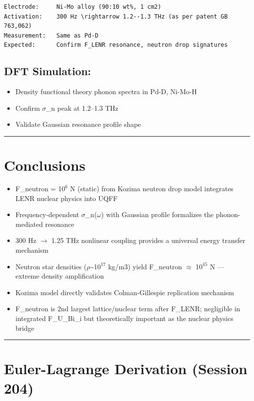 \documentclass[12pt,a4paper]{article}
\begin{document}
\begin{verbatim}
Electrode:     Ni-Mo alloy (90:10 wt%, 1 cm2)
Activation:    300 Hz \rightarrow 1.2--1.3 THz (as per patent GB 763,062)
Measurement:   Same as Pd-D
Expected:      Confirm F_LENR resonance, neutron drop signatures
\end{verbatim}

\subsection{DFT Simulation:}

\begin{itemize}
  \item Density functional theory phonon spectra in Pd-D, Ni-Mo-H
  \item Confirm $\sigma$\_n peak at 1.2--1.3 THz
  \item Validate Gaussian resonance profile shape
\end{itemize}

\medskip\hrule\medskip

\section{Conclusions}

\begin{itemize}
  \item F\_neutron = 1$0^{6}$ N (static) from Kozima neutron drop model integrates LENR nuclear physics into UQFF
  \item Frequency-dependent $\sigma$\_n($\omega$) with Gaussian profile formalizes the phonon-mediated resonance
  \item 300 Hz $\to$ 1.25 THz nonlinear coupling provides a universal energy transfer mechanism
  \item Neutron star densities ($\rho$\textasciitilde{}1$0^{17}$ kg/m3) yield F\_neutron $\approx$ 1$0^{45}$ N --- extreme density amplification
  \item Kozima model directly validates Colman-Gillespie replication mechanism
  \item F\_neutron is 2nd largest lattice/nuclear term after F\_LENR; negligible in integrated F\_{U\_Bi\_i} but theoretically important as the nuclear physics bridge
\end{itemize}

\medskip\hrule\medskip

\section{Euler-Lagrange Derivation (Session 204)}
\end{document}
